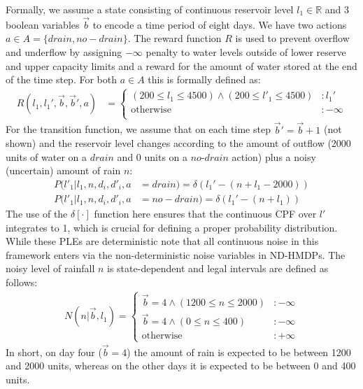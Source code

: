 \begin{example*}
Formally, we assume a state consisting of continuous reservoir level $l_1 \in \mathbb{R}$
and 3 boolean variables $\vec{b}$ to encode a time period of eight days.  We have
two actions $a \in A = \{ \mathit{drain}, \mathit{no}-\mathit{drain} \}$.
The reward function $R$ is used to prevent overflow and underflow by assigning
$-\infty$ penalty to water levels outside of lower reserve and upper
capacity limits and a reward for the amount of water stored at the end of
the time step.  For both $a \in A$ this is formally defined as:
\vspace{-2mm} 
{\footnotesize
\begin{align*}
R(l_1,l_1',\vec{b},\vec{b}',a) &= 
\begin{cases}
(200 \! \leq \! l_1 \! \leq \! 4500) \wedge (200 \! \leq \! l'_1 \! \leq \! 4500) & \!\! : l_1'\\
\text{otherwise} & \!\! : -\infty\\
\end{cases}
\end{align*}
}
For the transition function, we assume that on each time step $\vec{b}' = \vec{b} + 1$ (not shown)
and the reservoir level changes according to the amount of outflow (2000 units of water on a
$\mathit{drain}$ and 0 units on a $\mathit{no}$-$\mathit{drain}$ action)
plus a noisy (uncertain) amount of rain $n$:
{\footnotesize
\begin{align*}
P(l'_1|l_1,n,d_i,d'_i, a& =\mathit{drain}) = \delta \left( l_1'  - (n + l_1 - 2000) \right) \\
P(l'_1|l_1,n,d_i,d'_i, a&=\mathit{no}-\mathit{drain}) =\delta \left( l_1'  -  (n + l_1) \right)
\end{align*}}
The use of the $\delta[\cdot]$ function here ensures that the continuous CPF over $l'$ integrates to 1,
which is crucial for defining a proper probability distribution.  While these PLEs are deterministic
note that all continuous noise in this framework enters via the non-deterministic noise variables
in ND-HMDPs.  The noisy level of rainfall $n$ is state-dependent and legal intervals are defined as follows:
{\footnotesize
\begin{align*}
N(n|\vec{b},l_1) = \begin{cases}
\vec{b} = 4 \wedge (1200 \leq n \leq 2000) &: -\infty \\
\vec{b} = 4  \wedge (0 \leq n \leq 400)&: -\infty \\
\text{otherwise} &: +\infty
\end{cases}
\end{align*}}
In short, on day four ($\vec{b} = 4$) the amount of rain is expected to be between
1200 and 2000 units, whereas on the other days it is expected to be between 0 and 400 units.
\end{example*}

